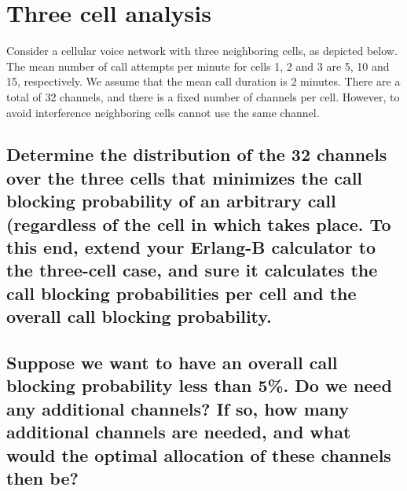 \documentclass[11pt]{article}
\begin{document}
    \section{Three cell analysis}\label{three-cell-analysis}

    Consider a cellular voice network with three neighboring cells, as
depicted below. The mean number of call attempts per minute for cells 1,
2 and 3 are 5, 10 and 15, respectively. We assume that the mean call
duration is 2 minutes. There are a total of 32 channels, and there is a
fixed number of channels per cell. However, to avoid interference
neighboring cells cannot use the same channel.

    \subsection{Determine the distribution of the 32 channels over the three
cells that minimizes the call blocking probability of an arbitrary call
(regardless of the cell in which takes place. To this end, extend your
Erlang-B calculator to the three-cell case, and sure it calculates the
call blocking probabilities per cell and the overall call blocking
probability.}\label{determine-the-distribution-of-the-32-channels-over-the-three-cells-that-minimizes-the-call-blocking-probability-of-an-arbitrary-call-regardless-of-the-cell-in-which-takes-place.-to-this-end-extend-your-erlang-b-calculator-to-the-three-cell-case-and-sure-it-calculates-the-call-blocking-probabilities-per-cell-and-the-overall-call-blocking-probability.}

    \subsection{Suppose we want to have an overall call blocking probability
less than 5\%. Do we need any additional channels? If so, how many
additional channels are needed, and what would the optimal allocation of
these channels then
be?}\label{suppose-we-want-to-have-an-overall-call-blocking-probability-less-than-5.-do-we-need-any-additional-channels-if-so-how-many-additional-channels-are-needed-and-what-would-the-optimal-allocation-of-these-channels-then-be}
\end{document}
